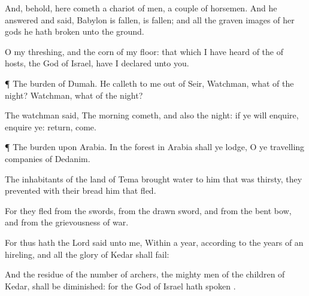 {And, behold, here
cometh a
chariot of
men,
{} a
couple of
horsemen. And he
answered and
said,
Babylon is
fallen, is
fallen; and all the graven
images of her
gods he hath
broken unto the
ground.

O my
threshing, and the
corn of my
floor: that which I have
heard of the
{} of
hosts, the
God of
Israel, have I
declared unto you.


\par }{\PP {}¶ The
burden of
Dumah. He
calleth to me out of
Seir,
Watchman, what of the
night?
Watchman, what of the
night?

The
watchman
said, The
morning
cometh, and also the
night: if ye will
enquire,
enquire ye:
return,
come.


\par }{\PP {}¶ The
burden upon
Arabia. In the
forest in
Arabia shall ye
lodge, O ye travelling
companies of
Dedanim.

The
inhabitants of the
land of
Tema
brought
water to
him that was
thirsty, they
prevented with their
bread him that
fled.

For they
fled
from the
swords,
from the
drawn
sword, and
from the
bent
bow, and
from the
grievousness of
war.

For thus hath the
Lord
said unto me, Within a
year, according to the
years of an
hireling, and all the
glory of
Kedar shall
fail:

And the
residue of the
number of
archers, the mighty
men of the
children of
Kedar, shall be
diminished: for the
{}
God of
Israel hath
spoken
{}.




\par }
